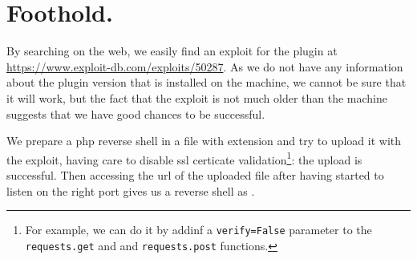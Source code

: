 \section{Foothold.}
\par By searching on the web, we easily find an exploit for the  plugin at \url{https://www.exploit-db.com/exploits/50287}. As we do not have any information about the plugin version that is installed on the machine, we cannot be sure that it will work, but the fact that the exploit is not much older than the machine suggests that we have good chances to be successful.
\par We prepare a php reverse shell in a file with  extension and try to upload it with the exploit, having care to disable ssl certicate validation\footnote{For example, we can do it by addinf a \texttt{verify=False} parameter to the \texttt{requests.get} and and \texttt{requests.post} functions.}: the upload is successful. Then accessing the url of the uploaded file after having started  to listen on the right port gives us a reverse shell as .
